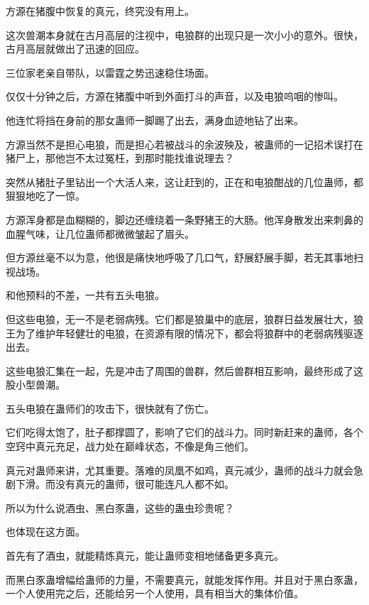 
\begin{this_body}



方源在猪腹中恢复的真元，终究没有用上。

这次兽潮本身就在古月高层的注视中，电狼群的出现只是一次小小的意外。很快，古月高层就做出了迅速的回应。

三位家老亲自带队，以雷霆之势迅速稳住场面。

仅仅十分钟之后，方源在猪腹中听到外面打斗的声音，以及电狼呜咽的惨叫。

他连忙将挡在身前的那女蛊师一脚踢了出去，满身血迹地钻了出来。

方源当然不是担心电狼，而是担心若被战斗的余波殃及，被蛊师的一记招术误打在猪尸上，那他岂不太过冤枉，到那时能找谁说理去？

突然从猪肚子里钻出一个大活人来，这让赶到的，正在和电狼酣战的几位蛊师，都狠狠地吃了一惊。

方源浑身都是血糊糊的，脚边还缠绕着一条野猪王的大肠。他浑身散发出来刺鼻的血腥气味，让几位蛊师都微微皱起了眉头。

但方源丝毫不以为意，他很是痛快地呼吸了几口气，舒展舒展手脚，若无其事地扫视战场。

和他预料的不差，一共有五头电狼。

但这些电狼，无一不是老弱病残。它们都是狼巢中的底层，狼群日益发展壮大，狼王为了维护年轻健壮的电狼，在资源有限的情况下，都会将狼群中的老弱病残驱逐出去。

这些电狼汇集在一起，先是冲击了周围的兽群，然后兽群相互影响，最终形成了这股小型兽潮。

五头电狼在蛊师们的攻击下，很快就有了伤亡。

它们吃得太饱了，肚子都撑圆了，影响了它们的战斗力。同时新赶来的蛊师，各个空窍中真元充足，战力处在巅峰状态，不像是角三他们。

真元对蛊师来讲，尤其重要。落难的凤凰不如鸡，真元减少，蛊师的战斗力就会急剧下滑。而没有真元的蛊师，很可能连凡人都不如。

所以为什么说酒虫、黑白豕蛊，这些的蛊虫珍贵呢？

也体现在这方面。

首先有了酒虫，就能精炼真元，能让蛊师变相地储备更多真元。

而黑白豕蛊增幅给蛊师的力量，不需要真元，就能发挥作用。并且对于黑白豕蛊，一个人使用完之后，还能给另一个人使用，具有相当大的集体价值。


\end{this_body}
